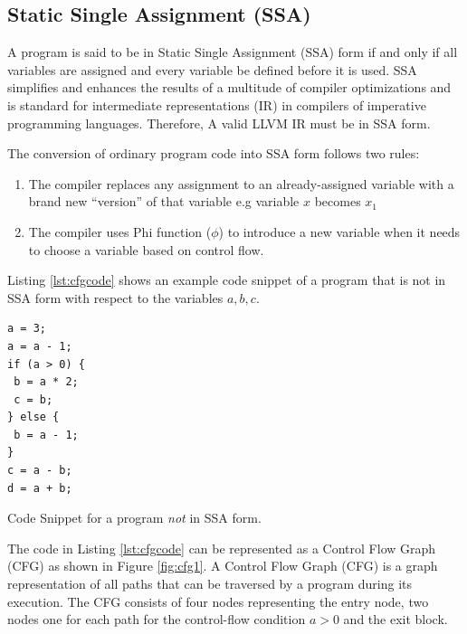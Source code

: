 \subsection{Static Single Assignment (SSA)}
A program is said to be in Static Single Assignment (SSA) \cite{ssa} form if and only if all variables are assigned and every variable be defined before it is used. SSA simplifies and enhances the results of a multitude of compiler optimizations and is standard for intermediate representations (IR) in compilers of imperative programming languages. Therefore, A valid LLVM IR must be in SSA form.

\noindent The conversion of ordinary program code into SSA form follows two rules:
\begin{enumerate}
    \item The compiler replaces any assignment to an already-assigned variable with a brand new “version” of that variable e.g variable \texttt{\textbf{$x$}} becomes \texttt{\textbf{$x_1$}}
    \item The compiler uses Phi function ($\phi$) to introduce a new variable when it needs to choose a variable based on control flow.
\end{enumerate}

Listing \ref{lst:cfgcode} shows an example code snippet of a program that is not in SSA form with respect to the variables $a, b, c$.

\begin{listing}[htbp]
\begin{verbatim}
a = 3;
a = a - 1;
if (a > 0) {
 b = a * 2;
 c = b;
} else {
 b = a - 1;
}
c = a - b;
d = a + b;
\end{verbatim}
\caption{Code Snippet for a program \textit{not} in SSA form.}
\label{lst:cfgcode}
\end{listing}

The code in Listing \ref{lst:cfgcode} can be represented as a Control Flow Graph (CFG) as shown in Figure \ref{fig:cfg1}. A Control Flow Graph (CFG) is a graph representation of all paths that can be traversed by a program during its execution. The CFG consists of four nodes representing the entry node, two nodes one for each path for the control-flow condition $a > 0$ and the exit block.


